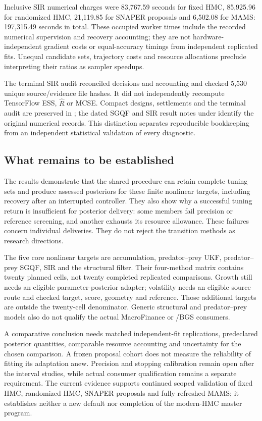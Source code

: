 Inclusive SIR numerical charges were 83,767.59 seconds for fixed HMC,
85,925.96 for randomized HMC, 21,119.85 for SNAPER proposals and 6,502.08
for MAMS: 197,315.49 seconds in total. These occupied worker times include
the recorded numerical supervision and recovery accounting; they are not
hardware-independent gradient costs or equal-accuracy timings from
independent replicated fits. Unequal candidate sets, trajectory costs and
resource allocations preclude interpreting their ratios as sampler speedups.

The terminal SIR audit reconciled decisions and accounting and checked
5,530 unique source/evidence file hashes. It did not independently recompute
TensorFlow ESS, $\widehat R$ or MCSE. Compact designs, settlements and the
terminal audit are preserved in
; the dated SGQF and SIR result
notes under  identify the original numerical records.
This distinction separates reproducible bookkeeping from an independent
statistical validation of every diagnostic.

\subsection{What remains to be established}

The results demonstrate that the shared procedure can retain complete tuning
sets and produce assessed posteriors for these finite nonlinear targets,
including recovery after an interrupted controller. They also show why a
successful tuning return is insufficient for posterior delivery: some
members fail precision or reference screening, and another exhausts its
resource allowance. These failures concern individual deliveries. They do
not reject the transition methods as research directions.

The five core nonlinear targets are accumulation, predator--prey UKF,
predator--prey SGQF, SIR and the structural filter. Their four-method matrix
contains twenty planned cells, not twenty completed replicated comparisons.
Growth still needs an eligible parameter-posterior adapter; volatility needs
an eligible source route and checked target, score, geometry and reference.
Those additional targets are outside the twenty-cell denominator. Generic
structural and predator--prey models also do not qualify the actual
MacroFinance or /BGS consumers.

A comparative conclusion needs matched independent-fit replications,
predeclared posterior quantities, comparable resource accounting and
uncertainty for the chosen comparison. A frozen proposal cohort does not
measure the reliability of fitting its adaptation anew. Precision and
stopping calibration remain open after the interval studies, while actual
consumer qualification remains a separate requirement. The current evidence
supports continued scoped validation of fixed HMC, randomized HMC, SNAPER
proposals and fully refreshed MAMS; it establishes neither a new default
nor completion of the modern-HMC master program.

